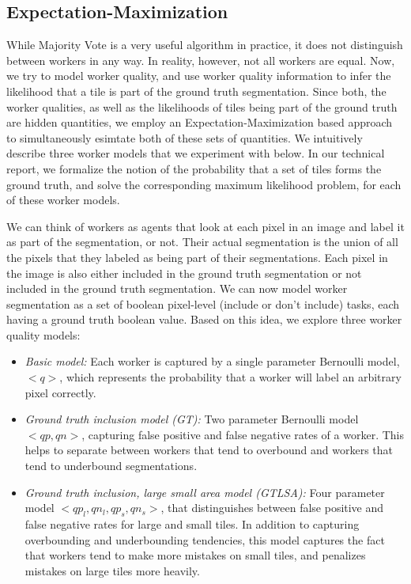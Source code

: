 \subsection{Expectation-Maximization}
While Majority Vote is a very useful algorithm in practice, it does not distinguish between workers in any way. In reality, however, not all workers are equal. Now, we try to model worker quality, and use worker quality information to infer the likelihood that a tile is part of the ground truth segmentation. Since both, the worker qualities, as well as the likelihoods of tiles being part of the ground truth are hidden quantities, we employ an Expectation-Maximization based approach to simultaneously esimtate both of these sets of quantities. We intuitively describe three worker models that we experiment with below. In our technical report, we formalize the notion of the probability that a set of tiles forms the ground truth, and solve the corresponding maximum likelihood problem, for each of these worker models.

We can think of workers as agents that look at each pixel in an image and label it as part of the segmentation, or not. Their actual segmentation is the union of all the pixels that they labeled as being part of their segmentations. Each pixel in the image is also either included in the ground truth segmentation or not included in the ground truth segmentation. We can now model worker segmentation as a set of boolean pixel-level (include or don't include) tasks, each having a ground truth boolean value. Based on this idea, we explore three worker quality models:
\begin{itemize}
\item {\em Basic model:} Each worker is captured by a single parameter Bernoulli model, $<q>$, which represents the probability that a worker will label an arbitrary pixel correctly.
\item {\em Ground truth inclusion model (GT):} Two parameter Bernoulli model $<qp, qn>$, capturing false positive and false negative rates of a worker. This helps to separate between workers that tend to overbound and workers that tend to underbound segmentations.
\item {\em Ground truth inclusion, large small area model (GTLSA):} Four parameter model $<qp_l, qn_l, qp_s, qn_s>$, that distinguishes between false positive and false negative rates for large and small tiles. In addition to capturing overbounding and underbounding tendencies, this model captures the fact that workers tend to make more mistakes on small tiles, and penalizes mistakes on large tiles more heavily.
\end{itemize}


